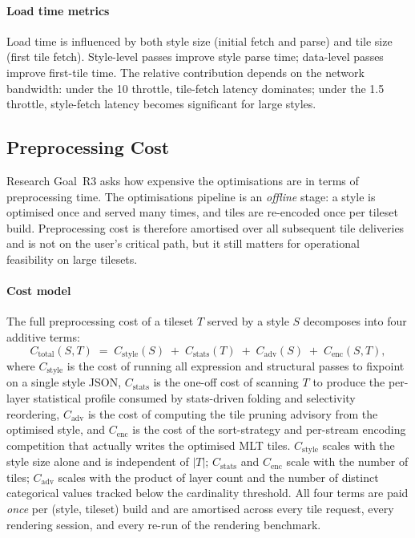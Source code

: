 \paragraph{Load time metrics}
Load time is influenced by both style size (initial fetch and parse) and tile size (first tile fetch).
Style-level passes improve style parse time; data-level passes improve first-tile time.
The relative contribution depends on the network bandwidth: under the \qty{10}{\Mbps} throttle, tile-fetch latency dominates; under the \qty{1.5}{\Mbps} throttle, style-fetch latency becomes significant for large styles.

\subsection{Preprocessing Cost}\label{sub_preprocessing_cost}

Research Goal~R3 asks how expensive the optimisations are in terms of preprocessing time.
The optimisations pipeline is an \emph{offline} stage: a style is optimised once and served many times, and tiles are re-encoded once per tileset build.
Preprocessing cost is therefore amortised over all subsequent tile deliveries and is not on the user's critical path, but it still matters for operational feasibility on large tilesets.

\paragraph{Cost model}
The full preprocessing cost of a tileset $T$ served by a style $S$ decomposes into four additive terms:
\begin{equation}\label{eq:cost_model}
    C_\text{total}(S, T) \;=\; C_\text{style}(S) \;+\; C_\text{stats}(T) \;+\; C_\text{adv}(S) \;+\; C_\text{enc}(S, T),
\end{equation}
where $C_\text{style}$ is the cost of running all expression and structural passes to fixpoint on a single style JSON, $C_\text{stats}$ is the one-off cost of scanning $T$ to produce the per-layer statistical profile consumed by stats-driven folding and selectivity reordering, $C_\text{adv}$ is the cost of computing the tile pruning advisory from the optimised style, and $C_\text{enc}$ is the cost of the sort-strategy and per-stream encoding competition that actually writes the optimised \ac{MLT} tiles.
$C_\text{style}$ scales with the style size alone and is independent of $|T|$; $C_\text{stats}$ and $C_\text{enc}$ scale with the number of tiles; $C_\text{adv}$ scales with the product of layer count and the number of distinct categorical values tracked below the cardinality threshold.
All four terms are paid \emph{once} per (style, tileset) build and are amortised across every tile request, every rendering session, and every re-run of the rendering benchmark.

